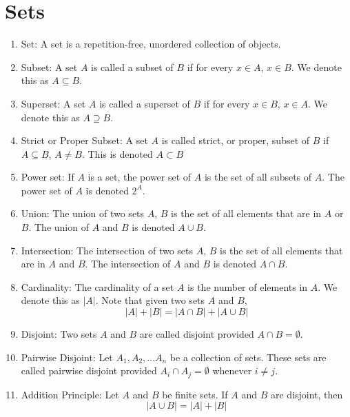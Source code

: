 \documentclass{article}
\begin{document}
	\section*{Sets}
	
	\begin{enumerate}
		
		\item Set: A set is a repetition-free, unordered collection of objects.
		
		\item Subset: A set $A$ is called a subset of $B$ if for every $x\in A$, $x\in B$.
		We denote this as $A\subseteq B$.
		
		\item Superset: A set $A$ is called a superset of $B$ if for every $x\in B$, $x\in A$.
		We denote this as $A\supseteq B$.
		
		\item Strict or Proper Subset: A set $A$ is called strict, or proper, subset of $B$ if $A \subseteq B$, $A\neq B$.
		This is denoted $A\subset B$
		
		\item Power set: If $A$ is a set, the power set of $A$ is the set of all subsets of $A$.
		The power set of $A$ is denoted $2^A$.
		
		\item Union: The union of two sets $A$, $B$ is the set of all elements that are in $A$ or $B$.
		The union of $A$ and $B$ is denoted $A\cup B$.
		
		\item Intersection: The intersection of two sets $A$, $B$ is the set of all elements that are in $A$ and $B$.
		The intersection of $A$ and $B$ is denoted $A\cap B$.
		
		\item Cardinality: The cardinality of a set $A$ is the number of elements in $A$.
		We denote this as $|A|$. Note that given two sets $A$ and $B$,
		\[|A|+|B|=|A\cap B|+|A\cup B|\]
		
		\item Disjoint: Two sets $A$ and $B$ are called disjoint provided $A\cap B=\emptyset$.
		
		\item Pairwise Disjoint: Let $A_1,A_2,\dots A_n$ be a collection of sets.
		These sets are called pairwise disjoint provided $A_i\cap A_j=\emptyset$ whenever $i\neq j$.
		
		\item Addition Principle: Let $A$ and $B$ be finite sets.
		If $A$ and $B$ are disjoint, then
		\[|A\cup B|=|A|+|B|\]
		

\end{enumerate}
\end{document}
